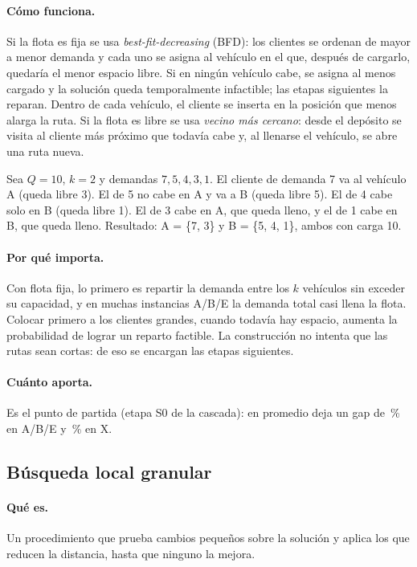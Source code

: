 \documentclass[11pt,a4paper]{article}
\begin{document}
\paragraph{Cómo funciona.} Si la flota es fija se usa \emph{best-fit-decreasing} (BFD): los clientes
se ordenan de mayor a menor demanda y cada uno se asigna al vehículo en el que, después de cargarlo,
quedaría el menor espacio libre. Si en ningún vehículo cabe, se asigna al menos cargado y la
solución queda temporalmente infactible; las etapas siguientes la reparan. Dentro de cada vehículo,
el cliente se inserta en la posición que menos alarga la ruta. Si la flota es libre se usa
\emph{vecino más cercano}: desde el depósito se visita al cliente más próximo que todavía cabe y, al
llenarse el vehículo, se abre una ruta nueva.

\begin{ejemplo}
Sea $Q=10$, $k=2$ y demandas $7,5,4,3,1$. El cliente de demanda 7 va al vehículo A (queda libre 3).
El de 5 no cabe en A y va a B (queda libre 5). El de 4 cabe solo en B (queda libre 1). El de 3 cabe
en A, que queda lleno, y el de 1 cabe en B, que queda lleno. Resultado: A = \{7, 3\} y B = \{5, 4,
1\}, ambos con carga 10.
\end{ejemplo}

\paragraph{Por qué importa.} Con flota fija, lo primero es repartir la demanda entre los $k$
vehículos sin exceder su capacidad, y en muchas instancias A/B/E la demanda total casi llena la
flota. Colocar primero a los clientes grandes, cuando todavía hay espacio, aumenta la probabilidad de
lograr un reparto factible. La construcción no intenta que las rutas sean cortas: de eso se encargan
las etapas siguientes.

\paragraph{Cuánto aporta.} Es el punto de partida (etapa S0 de la cascada): en promedio deja un gap
de \cgABEa\,\% en A/B/E y \cgXa\,\% en X.

\subsection{Búsqueda local granular}
\label{sec:granular}

\paragraph{Qué es.} Un procedimiento que prueba cambios pequeños sobre la solución y aplica los que
reducen la distancia, hasta que ninguno la mejora.
\end{document}
